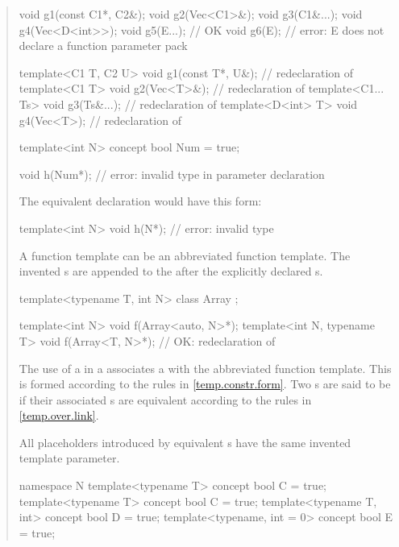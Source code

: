 \begin{quote}
\begin{codeblock}
void g1(const C1*, C2&);
void g2(Vec<C1>&);
void g3(C1&...);
void g4(Vec<D<int>>);
void g5(E...); // OK
void g6(E);    // error: E does not declare a function parameter pack

template<C1 T, C2 U> void g1(const T*, U&); // redeclaration of 
template<C1 T> void g2(Vec<T>&);            // redeclaration of 
template<C1... Ts> void g3(Ts&...);         // redeclaration of 
template<D<int> T> void g4(Vec<T>);         // redeclaration of 
\end{codeblock}
\exitexample

\enterexample
\begin{codeblock}
template<int N> concept bool Num = true;

void h(Num*); // error: invalid type in parameter declaration
      \end{codeblock}
The equivalent declaration would have this form:
      \begin{codeblock}
template<int N> void h(N*); // error: invalid type
\end{codeblock}
\exitexample

\pnum
A function template can be an abbreviated function template. The 
invented s are appended to the 
 after the explicitly declared 
s.

\enterexample
\begin{codeblock}
template<typename T, int N> class Array { };

template<int N> void f(Array<auto, N>*);
template<int N, typename T> void f(Array<T, N>*); // OK: redeclaration of 
\end{codeblock}
\exitexample

\pnum
The use of a  in a 
 associates a 
 with the abbreviated function template. 
% 
This  is formed according to the rules 
in \ref{temp.constr.form}.
% 
Two s are said to be 
 if their associated s are
equivalent according to the rules in \ref{temp.over.link}.


\pnum
All placeholders introduced by equivalent 
s
have the same invented template parameter.
% 
\enterexample
\begin{codeblock}
namespace N {
  template<typename T> concept bool C = true;
}
template<typename T> concept bool C = true;
template<typename T, int> concept bool D = true;
template<typename, int = 0> concept bool E = true;


\end{codeblock}
\end{quote}
